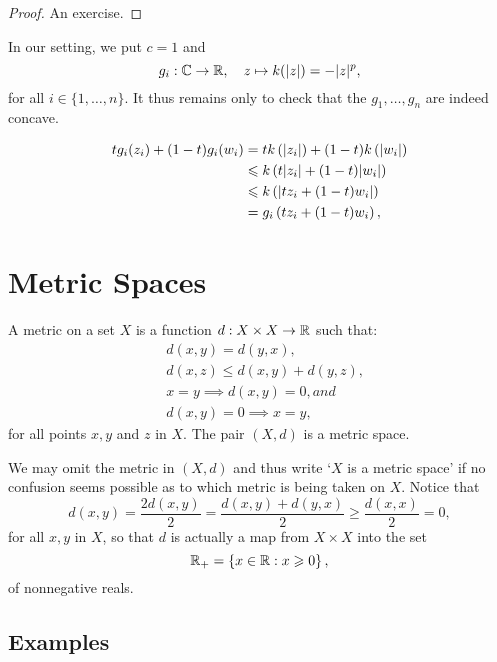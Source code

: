 \begin{proof}
  An exercise.
\end{proof}

In our setting, we put \(c=1\) and
\[
  g_{i}:\mathbb{C}\to\mathbb{R},\quad{z\mapsto{k(\lvert z\rvert)=-\lvert z\rvert^{p}}},
\]
for all \(i\in\{1,\ldots,n\}\). It thus remains only to check that
the \(g_{1},\ldots,g_{n}\) are indeed concave.

\begin{align*}
  tg_{i}(z_{i})+(1-t)g_{i}(w_{i})
  &=
  tk\left(\lvert z_{i}\rvert\right)+(1-t)k\left(\lvert w_{i}\rvert\right)
  \\
  &\leqslant
  k\left(t\lvert z_{i}\rvert+(1-t)\lvert w_{i}\rvert\right)
  \\
  &\leqslant
  k\left(\lvert tz_{i}+(1-t)w_{i}\rvert\right)
  \\
  &=
  g_{i}\left(tz_{i}+(1-t)w_{i}\right),
\end{align*}

\section{Metric Spaces}\label{sec:metric-spaces}

\begin{definition}
  A metric on a set \(X\) is a function \(d:X\times{X}\to\mathbb{R}\) such that:
  \begin{align}
      & d(x,y)=d(y,x),                  \label{axiom:metric-space-01} \\
      & d(x,z)\leqslant{d(x,y)+d(y,z)}, \label{axiom:metric-space-02} \\
      & x=y\implies{d(x,y)=0}, and      \label{axiom:metric-space-03} \\
      & d(x,y)=0\implies{x=y},          \label{axiom:metric-space-04}
  \end{align}
  for all points \(x,y\) and \(z\) in \(X\). The pair \((X,d)\) is a metric
  space.
\end{definition}

We may omit the metric in \((X,d)\) and thus write `\(X\) is a metric space' if
no confusion seems possible as to which metric is being taken on \(X\). Notice
that
\[
  d(x,y)
  =
  \frac{2d(x,y)}{2}
  =
  \frac{d(x,y)+d(y,x)}{2}
  \geqslant
  \frac{d(x,x)}{2}
  =
  0,
\]
for all \(x,y\) in \(X\), so that \(d\) is actually a map from \(X\times{X}\)
into the set
\[
  \mathbb{R}_{+}
  =
  \left\{x\in\mathbb{R}:x\geqslant{0}\right\},
\]
of nonnegative reals.

\subsection{Examples}

